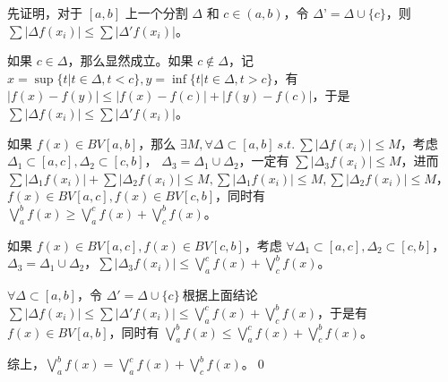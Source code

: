 先证明，对于 $\displaystyle [ a,b]$ 上一个分割 $\displaystyle \Delta $ 和 $\displaystyle c\in ( a,b)$，令 $\displaystyle \Delta ’=\Delta \cup \{c\}$，则 $\displaystyle \sum |\Delta f( x_{i}) |\leqslant \sum |\Delta 'f( x_{i}) |$。

如果 $\displaystyle c\in \Delta $，那么显然成立。如果 $\displaystyle c\notin \Delta $，记 $\displaystyle x=\sup \{t|t\in \Delta ,t< c\} ,y=\inf\{t|t\in \Delta ,t >c\}$，有 $\displaystyle |f( x) -f( y) |\leqslant |f( x) -f( c) |+|f( y) -f( c) |$，于是$\displaystyle \sum |\Delta f( x_{i}) |\leqslant \sum |\Delta 'f( x_{i}) |$。



如果 $\displaystyle f( x) \in BV[ a,b]$，那么 $\displaystyle \exists M, \forall \Delta \subset [ a,b] \ s.t.\ \sum |\Delta f( x_{i}) |\leqslant M$，考虑 $\displaystyle \Delta _{1} \subset [ a,c] ,\Delta _{2} \subset [ c,b]$， $\displaystyle \Delta _{3} =\Delta _{1} \cup \Delta _{2}$，一定有 $\displaystyle \sum |\Delta _{3} f( x_{i}) |\leqslant M$，进而$\displaystyle \sum |\Delta _{1} f( x_{i}) |+\sum |\Delta _{2} f( x_{i}) |\leqslant M,\sum |\Delta _{1} f( x_{i}) |\leqslant M,\sum |\Delta _{2} f( x_{i}) |\leqslant M$，$\displaystyle f( x) \in BV[ a,c] ,f( x) \in BV[ c,b]$，同时有 $\displaystyle \bigvee _{a}^{b} f( x) \geqslant \bigvee _{a}^{c} f( x) +\bigvee _{c}^{b} f( x)$。



如果 $\displaystyle f( x) \in BV[ a,c] ,f( x) \in BV[ c,b]$，考虑 $\displaystyle \forall \Delta _{1} \subset [ a,c] ,\Delta _{2} \subset [ c,b]$， $\displaystyle \Delta _{3} =\Delta _{1} \cup \Delta _{2}$，$\displaystyle \sum |\Delta _{3} f( x_{i}) |\leqslant \bigvee _{a}^{c} f( x) +\bigvee _{c}^{b} f( x)$。

$\displaystyle \forall \Delta \subset [ a,b]$，令 $\displaystyle \Delta '=\Delta \cup \{c\} \ $根据上面结论 $\displaystyle \sum |\Delta f( x_{i}) |\leqslant \sum |\Delta ' f( x_{i}) |\leqslant \bigvee _{a}^{c} f( x) +\bigvee _{c}^{b} f( x)$，于是有 $\displaystyle f( x) \in BV[ a,b]$，同时有 $\displaystyle \bigvee _{a}^{b} f( x) \leqslant \bigvee _{a}^{c} f( x) +\bigvee _{c}^{b} f( x)$。



综上，$\displaystyle \bigvee _{a}^{b} f( x) =\bigvee _{a}^{c} f( x) +\bigvee _{c}^{b} f( x)$。\qed 



\ifx\allfiles\undefined

\fi